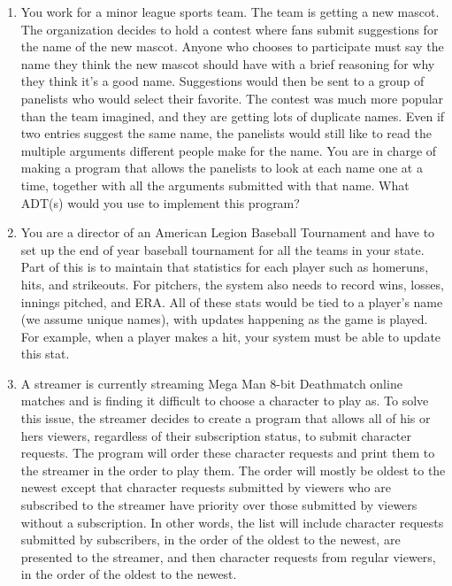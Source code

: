\documentclass{article}
\begin{document}
\begin{enumerate}
\item 
You work for a minor league sports team. The team is getting a new
mascot. The organization decides to hold a contest where fans submit
suggestions for the name of the new mascot. Anyone who chooses to
participate must say the name they think the new mascot should have
with a brief reasoning for why they think it's a good
name. Suggestions would then be sent to a group of panelists who would
select their favorite. The contest was much more popular than the team
imagined, and they are getting lots of duplicate names. Even if two
entries suggest the same name, the panelists would still like to read
the multiple arguments different people make for the name. You are in
charge of making a program that allows the panelists to look at each
name one at a time, together with all the arguments submitted with
that name.
What ADT(s) would you use to implement this program?

\item  
You are a director of an American Legion Baseball Tournament and have
to set up the end of year baseball tournament for all the teams in
your state.
Part of this is to maintain that statistics for each player such as
homeruns, hits, and strikeouts.
For pitchers, the system also needs to record wins, losses, innings pitched,
and ERA.
All of these stats would be tied to a player's name (we assume unique
names), with updates happening as the game is played.
For example, when a player makes a hit, your system must be able to
update this stat.

\item 
A streamer is currently streaming Mega Man 8-bit Deathmatch online
matches and is finding it difficult to choose a character to play as.
To solve this issue, the streamer decides to create a program that allows
all of his or hers viewers, regardless of their subscription status,
to submit character requests.
The program will order these character requests and print them to the
streamer in the order to play them.
The order will mostly be oldest to the newest except that character
requests submitted by viewers who are
subscribed to the streamer have priority over those submitted by
viewers without a subscription.
In other words, the list will include character requests submitted by subscribers, in the order of the oldest to the
newest, are presented to the streamer, and then character requests from regular viewers, in the order of the oldest to the newest.

\end{enumerate}
\end{document}
